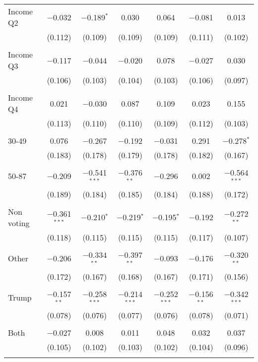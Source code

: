 \begin{tabular}{@{\extracolsep{5pt}}lcccccc}
 Income Q2 & $-$0.032 & $-$0.189$^{*}$ & 0.030 & 0.064 & $-$0.081 & 0.013 \\ 
  & (0.112) & (0.109) & (0.109) & (0.109) & (0.111) & (0.102) \\ 
  & & & & & & \\ 
 Income Q3 & $-$0.117 & $-$0.044 & $-$0.020 & 0.078 & $-$0.027 & 0.030 \\ 
  & (0.106) & (0.103) & (0.104) & (0.103) & (0.106) & (0.097) \\ 
  & & & & & & \\ 
 Income Q4 & 0.021 & $-$0.030 & 0.087 & 0.109 & 0.023 & 0.155 \\ 
  & (0.113) & (0.110) & (0.110) & (0.109) & (0.112) & (0.103) \\ 
  & & & & & & \\ 
 30-49 & 0.076 & $-$0.267 & $-$0.192 & $-$0.031 & 0.291 & $-$0.278$^{*}$ \\ 
  & (0.183) & (0.178) & (0.179) & (0.178) & (0.182) & (0.167) \\ 
  & & & & & & \\ 
 50-87 & $-$0.209 & $-$0.541$^{***}$ & $-$0.376$^{**}$ & $-$0.296 & 0.002 & $-$0.564$^{***}$ \\ 
  & (0.189) & (0.184) & (0.185) & (0.184) & (0.188) & (0.172) \\ 
  & & & & & & \\ 
 Non voting & $-$0.361$^{***}$ & $-$0.210$^{*}$ & $-$0.219$^{*}$ & $-$0.195$^{*}$ & $-$0.192 & $-$0.272$^{**}$ \\ 
  & (0.118) & (0.115) & (0.115) & (0.115) & (0.117) & (0.107) \\ 
  & & & & & & \\ 
 Other & $-$0.206 & $-$0.334$^{**}$ & $-$0.397$^{**}$ & $-$0.093 & $-$0.176 & $-$0.320$^{**}$ \\ 
  & (0.172) & (0.167) & (0.168) & (0.167) & (0.171) & (0.156) \\ 
  & & & & & & \\ 
 Trump & $-$0.157$^{**}$ & $-$0.258$^{***}$ & $-$0.214$^{***}$ & $-$0.252$^{***}$ & $-$0.156$^{**}$ & $-$0.342$^{***}$ \\ 
  & (0.078) & (0.076) & (0.077) & (0.076) & (0.078) & (0.071) \\ 
  & & & & & & \\ 
 Both & $-$0.027 & 0.008 & 0.011 & 0.048 & 0.032 & 0.037 \\ 
  & (0.105) & (0.102) & (0.103) & (0.102) & (0.104) & (0.096) \\ 
  & & & & & & \\ 

\end{tabular}
